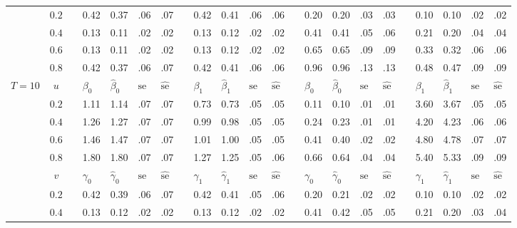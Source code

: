 \documentclass[12pt]{article}
\begin{document}
\begin{sidewaystable}
\begin{tabular}{cc
m{0.01cm}m{0.45cm}m{0.45cm}m{0.2cm}m{0.2cm}
m{0.01cm}m{0.45cm}m{0.45cm}m{0.2cm}m{0.2cm}
m{0.01cm}m{0.45cm}m{0.45cm}m{0.2cm}m{0.2cm}
m{0.01cm}m{0.45cm}m{0.45cm}m{0.2cm}m{0.2cm}
}
& $0.2$ && 0.42 & 0.37 & .06 & .07	&& 0.42 & 0.41 & .06 & .06	&& 0.20 & 0.20 & .03 & .03	&& 0.10 & 0.10 & .02 & .02\\
& $0.4$ && 0.13 & 0.11 & .02 & .02	&& 0.13 & 0.12 & .02 & .02	&& 0.41 & 0.41 & .05 & .06	&& 0.21 & 0.20 & .04 & .04\\
& $0.6$ && 0.13 & 0.11 & .02 & .02	&& 0.13 & 0.12 & .02 & .02	&& 0.65 & 0.65 & .09 & .09	&& 0.33 & 0.32 & .06 & .06\\
& $0.8$ && 0.42 & 0.37 & .06 & .07	&& 0.42 & 0.41 & .06 & .06	&& 0.96 & 0.96 & .13 & .13	&& 0.48 & 0.47 & .09 & .09\\
$T = 10$ & $u$ && 
	$\beta_0$ & $\hat\beta_0$ & $\text{se}$ & $\hat{\text{se}}$ &&
	$\beta_1$ & $\hat\beta_1$ & $\text{se}$ & $\hat{\text{se}}$ &&
	$\beta_0$ & $\hat\beta_0$ & $\text{se}$ & $\hat{\text{se}}$ &&
	$\beta_1$ & $\hat\beta_1$ & $\text{se}$ & $\hat{\text{se}}$\\
\cline{4-7}\cline{9-12}\cline{14-17}\cline{19-22}
& $0.2$ && 1.11 & 1.14 & .07 & .07	&& 0.73 & 0.73 & .05 & .05	&& 0.11 & 0.10 & .01 & .01	&& 3.60 & 3.67 & .05 & .05\\
& $0.4$ && 1.26 & 1.27 & .07 & .07	&& 0.99 & 0.98 & .05 & .05	&& 0.24 & 0.23 & .01 & .01	&& 4.20 & 4.23 & .06 & .06\\
& $0.6$ && 1.46 & 1.47 & .07 & .07	&& 1.01 & 1.00 & .05 & .05	&& 0.41 & 0.40 & .02 & .02	&& 4.80 & 4.78 & .07 & .07\\
& $0.8$ && 1.80 & 1.80 & .07 & .07	&& 1.27 & 1.25 & .05 & .06	&& 0.66 & 0.64 & .04 & .04	&& 5.40 & 5.33 & .09 & .09\\
& $v$ && 
	$\gamma_0$ & $\hat\gamma_0$ & $\text{se}$ & $\hat{\text{se}}$ &&
	$\gamma_1$ & $\hat\gamma_1$ & $\text{se}$ & $\hat{\text{se}}$ &&
	$\gamma_0$ & $\hat\gamma_0$ & $\text{se}$ & $\hat{\text{se}}$ &&
	$\gamma_1$ & $\hat\gamma_1$ & $\text{se}$ & $\hat{\text{se}}$\\
\cline{4-7}\cline{9-12}\cline{14-17}\cline{19-22}
& $0.2$ && 0.42 & 0.39 & .06 & .07	&& 0.42 & 0.41 & .05 & .06	&& 0.20 & 0.21 & .02 & .02	&& 0.10 & 0.10 & .02 & .02\\
& $0.4$ && 0.13 & 0.12 & .02 & .02	&& 0.13 & 0.12 & .02 & .02	&& 0.41 & 0.42 & .05 & .05	&& 0.21 & 0.20 & .03 & .04\\

\end{tabular}
\end{sidewaystable}
\end{document}

